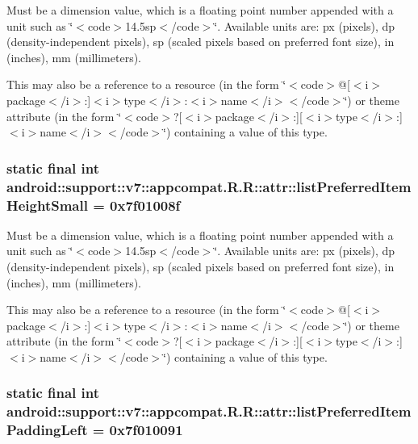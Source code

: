 Must be a dimension value, which is a floating point number appended with a unit such as \char`\"{}$<$code$>$14.5sp$<$/code$>$\char`\"{}. Available units are: px (pixels), dp (density-independent pixels), sp (scaled pixels based on preferred font size), in (inches), mm (millimeters). 

This may also be a reference to a resource (in the form \char`\"{}$<$code$>$@\mbox{[}$<$i$>$package$<$/i$>$:\mbox{]}$<$i$>$type$<$/i$>$:$<$i$>$name$<$/i$>$$<$/code$>$\char`\"{}) or theme attribute (in the form \char`\"{}$<$code$>$?\mbox{[}$<$i$>$package$<$/i$>$:\mbox{]}\mbox{[}$<$i$>$type$<$/i$>$:\mbox{]}$<$i$>$name$<$/i$>$$<$/code$>$\char`\"{}) containing a value of this type. \hypertarget{classandroid_1_1support_1_1v7_1_1appcompat_1_1_r_1_1attr_d76abb39589d97c3d527d2c3859e0b07}{
\subsubsection[{listPreferredItemHeightSmall}]{\setlength{\rightskip}{0pt plus 5cm}static final int android::support::v7::appcompat.R.R::attr::listPreferredItemHeightSmall = 0x7f01008f}}
\label{classandroid_1_1support_1_1v7_1_1appcompat_1_1_r_1_1attr_d76abb39589d97c3d527d2c3859e0b07}


Must be a dimension value, which is a floating point number appended with a unit such as \char`\"{}$<$code$>$14.5sp$<$/code$>$\char`\"{}. Available units are: px (pixels), dp (density-independent pixels), sp (scaled pixels based on preferred font size), in (inches), mm (millimeters). 

This may also be a reference to a resource (in the form \char`\"{}$<$code$>$@\mbox{[}$<$i$>$package$<$/i$>$:\mbox{]}$<$i$>$type$<$/i$>$:$<$i$>$name$<$/i$>$$<$/code$>$\char`\"{}) or theme attribute (in the form \char`\"{}$<$code$>$?\mbox{[}$<$i$>$package$<$/i$>$:\mbox{]}\mbox{[}$<$i$>$type$<$/i$>$:\mbox{]}$<$i$>$name$<$/i$>$$<$/code$>$\char`\"{}) containing a value of this type. \hypertarget{classandroid_1_1support_1_1v7_1_1appcompat_1_1_r_1_1attr_0afd4bf47c9df1f2c9d29732faa43d30}{
\subsubsection[{listPreferredItemPaddingLeft}]{\setlength{\rightskip}{0pt plus 5cm}static final int android::support::v7::appcompat.R.R::attr::listPreferredItemPaddingLeft = 0x7f010091}}
\label{classandroid_1_1support_1_1v7_1_1appcompat_1_1_r_1_1attr_0afd4bf47c9df1f2c9d29732faa43d30}


